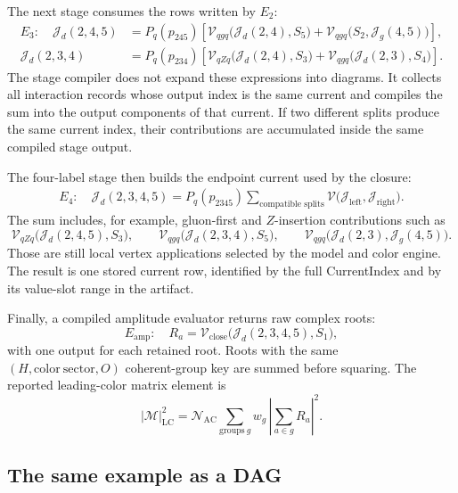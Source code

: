 \documentclass[10pt]{article}
\newcommand{\J}{\mathcal{J}}
\newcommand{\V}{\mathcal{V}}
\newcommand{\M}{\mathcal{M}}
\begin{document}
The next stage consumes the rows written by $E_2$:
\begin{align}
E_3:\quad
  \J_d(2,4,5) &=
    P_q(p_{245})\left[
      \V_{qgq}\bigl(\J_d(2,4),S_5\bigr)
      + \V_{qgq}\bigl(S_2,\J_g(4,5)\bigr)
    \right],\\
  \J_d(2,3,4) &=
    P_q(p_{234})\left[
      \V_{qZq}\bigl(\J_d(2,4),S_3\bigr)
      + \V_{qgq}\bigl(\J_d(2,3),S_4\bigr)
    \right].
    \label{eq:e3-stage}
\end{align}
The stage compiler does not expand these expressions into diagrams.  It
collects all interaction records whose output index is the same current and
compiles the sum into the output components of that current.  If two different
splits produce the same current index, their contributions are accumulated
inside the same compiled stage output.

The four-label stage then builds the endpoint current used by the closure:
\begin{align}
E_4:\quad
  \J_d(2,3,4,5) =
    P_q(p_{2345})
    \sum_{\text{compatible splits}}
      \V\bigl(\J_{\mathrm{left}},\J_{\mathrm{right}}\bigr).
    \label{eq:e4-stage}
\end{align}
The sum includes, for example, gluon-first and $Z$-insertion contributions such
as
\[
  \V_{qZq}\bigl(\J_d(2,4,5),S_3\bigr),\qquad
  \V_{qgq}\bigl(\J_d(2,3,4),S_5\bigr),\qquad
  \V_{qgq}\bigl(\J_d(2,3),\J_g(4,5)\bigr).
\]
Those are still local vertex applications selected by the model and color
engine.  The result is one stored current row, identified by the full
CurrentIndex and by its value-slot range in the artifact.

Finally, a compiled amplitude evaluator returns raw complex roots:
\begin{equation}
  E_{\mathrm{amp}}:\quad
  R_a =
  \V_{\mathrm{close}}\bigl(\J_d(2,3,4,5),S_1\bigr),
  \label{eq:amplitude-stage}
\end{equation}
with one output for each retained root.  Roots with the same
$(H,\mathrm{color\ sector},O)$ coherent-group key are summed before squaring.
The reported leading-color matrix element is
\begin{equation}
  |\M|^2_{\mathrm{LC}}
  =
  \mathcal{N}_{\mathrm{AC}}
  \sum_{\mathrm{groups}\ g}
  w_g\,
  \left|\sum_{a\in g} R_a\right|^2 .
  \label{eq:lc-final-reduction}
\end{equation}

\subsection*{The same example as a DAG}
\end{document}
